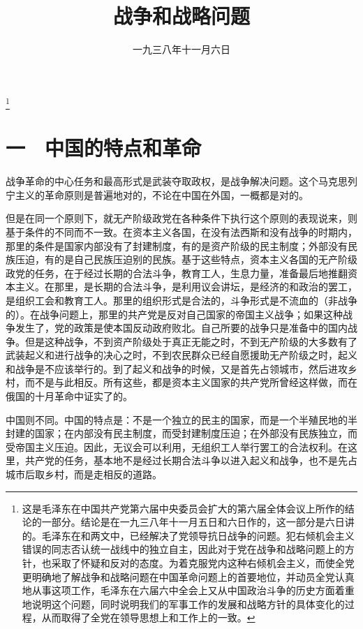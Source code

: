 
\title{战争和战略问题}
\date{一九三八年十一月六日}
\thanks{这是毛泽东在中国共产党第六届中央委员会扩大的第六届全体会议上所作的结论的一部分。结论是在一九三八年十一月五日和六日作的，这一部分是六日讲的。毛泽东在和两文中，已经解决了党领导抗日战争的问题。犯右倾机会主义错误的同志否认统一战线中的独立自主，因此对于党在战争和战略问题上的方针，也采取了怀疑和反对的态度。为着克服党内这种右倾机会主义，而使全党更明确地了解战争和战略问题在中国革命问题上的首要地位，并动员全党认真地从事这项工作，毛泽东在六届六中全会上又从中国政治斗争的历史方面着重地说明这个问题，同时说明我们的军事工作的发展和战略方针的具体变化的过程，从而取得了全党在领导思想上和工作上的一致。}
\maketitle


\section{一　中国的特点和革命}

战争革命的中心任务和最高形式是武装夺取政权，是战争解决问题。这个马克思列宁主义的革命原则是普遍地对的，不论在中国在外国，一概都是对的。

但是在同一个原则下，就无产阶级政党在各种条件下执行这个原则的表现说来，则基于条件的不同而不一致。在资本主义各国，在没有法西斯和没有战争的时期内，那里的条件是国家内部没有了封建制度，有的是资产阶级的民主制度；外部没有民族压迫，有的是自己民族压迫别的民族。基于这些特点，资本主义各国的无产阶级政党的任务，在于经过长期的合法斗争，教育工人，生息力量，准备最后地推翻资本主义。在那里，是长期的合法斗争，是利用议会讲坛，是经济的和政治的罢工，是组织工会和教育工人。那里的组织形式是合法的，斗争形式是不流血的（非战争的）。在战争问题上，那里的共产党是反对自己国家的帝国主义战争；如果这种战争发生了，党的政策是使本国反动政府败北。自己所要的战争只是准备中的国内战争。但是这种战争，不到资产阶级处于真正无能之时，不到无产阶级的大多数有了武装起义和进行战争的决心之时，不到农民群众已经自愿援助无产阶级之时，起义和战争是不应该举行的。到了起义和战争的时候，又是首先占领城市，然后进攻乡村，而不是与此相反。所有这些，都是资本主义国家的共产党所曾经这样做，而在俄国的十月革命中证实了的。

中国则不同。中国的特点是：不是一个独立的民主的国家，而是一个半殖民地的半封建的国家；在内部没有民主制度，而受封建制度压迫；在外部没有民族独立，而受帝国主义压迫。因此，无议会可以利用，无组织工人举行罢工的合法权利。在这里，共产党的任务，基本地不是经过长期合法斗争以进入起义和战争，也不是先占城市后取乡村，而是走相反的道路。

